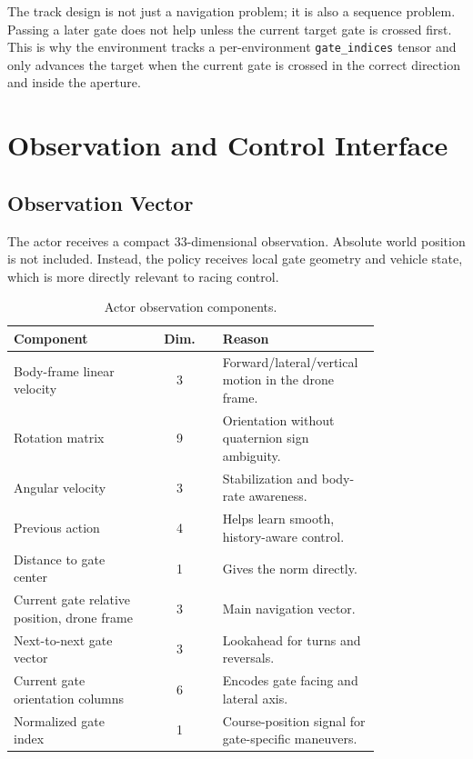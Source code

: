 \documentclass[11pt]{article}
\begin{document}
The track design is not just a navigation problem; it is also a sequence
problem. Passing a later gate does not help unless the current target gate is
crossed first. This is why the environment tracks a per-environment
\texttt{gate\_indices} tensor and only advances the target when the current gate
is crossed in the correct direction and inside the aperture.

\section{Observation and Control Interface}

\subsection{Observation Vector}

The actor receives a compact 33-dimensional observation. Absolute world position
is not included. Instead, the policy receives local gate geometry and vehicle
state, which is more directly relevant to racing control.

\begin{table}[H]
\centering
\caption{Actor observation components.}
\label{tab:obs}
\small
\begin{tabular}{p{0.37\linewidth}cp{0.43\linewidth}}
\toprule
\textbf{Component} & \textbf{Dim.} & \textbf{Reason} \\
\midrule
Body-frame linear velocity & 3 & Forward/lateral/vertical motion in the drone frame. \\
Rotation matrix & 9 & Orientation without quaternion sign ambiguity. \\
Angular velocity & 3 & Stabilization and body-rate awareness. \\
Previous action & 4 & Helps learn smooth, history-aware control. \\
Distance to gate center & 1 & Gives the norm directly. \\
Current gate relative position, drone frame & 3 & Main navigation vector. \\
Next-to-next gate vector & 3 & Lookahead for turns and reversals. \\
Current gate orientation columns & 6 & Encodes gate facing and lateral axis. \\
Normalized gate index & 1 & Course-position signal for gate-specific maneuvers. \\
\bottomrule
\end{tabular}
\end{table}
\end{document}
